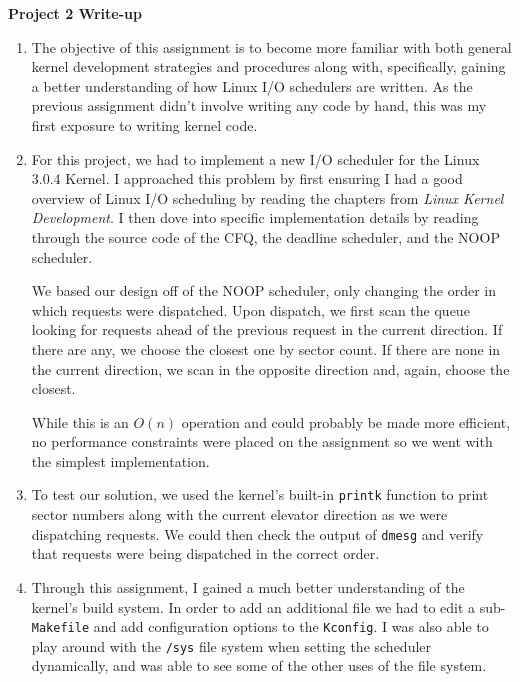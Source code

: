 \documentclass[12pt,letterpaper]{article}
\begin{document}
{\center\textbf{Project 2 Write-up} \\}

\begin{enumerate}

\item The objective of this assignment is to become more familiar with both
  general kernel development strategies and procedures along with, specifically,
  gaining a better understanding of how Linux I/O schedulers are written.  As
  the previous assignment didn't involve writing any code by hand, this was my
  first exposure to writing kernel code.
  
\item For this project, we had to implement a new I/O scheduler for the Linux
  3.0.4 Kernel.  I approached this problem by first ensuring I had a good
  overview of Linux I/O scheduling by reading the chapters from \textit{Linux
  Kernel Development}.  I then dove into specific implementation details by
  reading through the source code of the CFQ, the deadline scheduler, and the
  NOOP scheduler.

  We based our design off of the NOOP scheduler, only changing the order in
  which requests were dispatched.  Upon dispatch, we first scan the queue
  looking for requests ahead of the previous request in the current direction.
  If there are any, we choose the closest one by sector count.  If there are
  none in the current direction, we scan in the opposite direction and, again,
  choose the closest.
  
  While this is an $O(n)$ operation and could probably be made more
  efficient, no performance constraints were placed on the assignment so we went
  with the simplest implementation.

\item To test our solution, we used the kernel's built-in \texttt{printk}
  function to print sector numbers along with the current elevator direction as
  we were dispatching requests.  We could then check the output of
  \texttt{dmesg} and verify that requests were being dispatched in the correct
  order.

\item Through this assignment, I gained a much better understanding of the
  kernel's build system.  In order to add an additional file we had to edit a
  sub-\texttt{Makefile} and add configuration options to the \texttt{Kconfig}.
  I was also able to play around with the \texttt{/sys} file system when setting
  the scheduler dynamically, and was able to see some of the other uses of the
  file system.

\end{enumerate}
\end{document}
